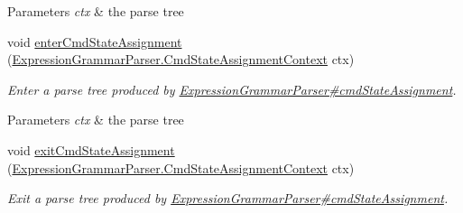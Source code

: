 \begin{DoxyCompactItemize}
\begin{DoxyCompactList}
\begin{DoxyParams}{Parameters}
{\em ctx} & the parse tree\\
\hline
\end{DoxyParams}
 \end{DoxyCompactList}\item 
void \hyperlink{classgov_1_1nasa_1_1jpf_1_1inspector_1_1server_1_1expression_1_1parser_1_1_expression_grammar_base_listener_ad300c7a8f2564f6e7ba36dde2123dc4d}{enter\+Cmd\+State\+Assignment} (\hyperlink{classgov_1_1nasa_1_1jpf_1_1inspector_1_1server_1_1expression_1_1parser_1_1_expression_grammar_padaf6f2235297f2d833b81c76746458f3}{Expression\+Grammar\+Parser.\+Cmd\+State\+Assignment\+Context} ctx)
\begin{DoxyCompactList}\small\item\em Enter a parse tree produced by \hyperlink{classgov_1_1nasa_1_1jpf_1_1inspector_1_1server_1_1expression_1_1parser_1_1_expression_grammar_parser_a1958fde2beccd39e36dd73e36ef1ffd6}{Expression\+Grammar\+Parser\#cmd\+State\+Assignment}.


\begin{DoxyParams}{Parameters}
{\em ctx} & the parse tree\\
\hline
\end{DoxyParams}
 \end{DoxyCompactList}\item 
void \hyperlink{classgov_1_1nasa_1_1jpf_1_1inspector_1_1server_1_1expression_1_1parser_1_1_expression_grammar_base_listener_aa6976b1f683142f46fa329507cbb3cb6}{exit\+Cmd\+State\+Assignment} (\hyperlink{classgov_1_1nasa_1_1jpf_1_1inspector_1_1server_1_1expression_1_1parser_1_1_expression_grammar_padaf6f2235297f2d833b81c76746458f3}{Expression\+Grammar\+Parser.\+Cmd\+State\+Assignment\+Context} ctx)
\begin{DoxyCompactList}\small\item\em Exit a parse tree produced by \hyperlink{classgov_1_1nasa_1_1jpf_1_1inspector_1_1server_1_1expression_1_1parser_1_1_expression_grammar_parser_a1958fde2beccd39e36dd73e36ef1ffd6}{Expression\+Grammar\+Parser\#cmd\+State\+Assignment}.



\end{DoxyCompactList}
\end{DoxyCompactItemize}
